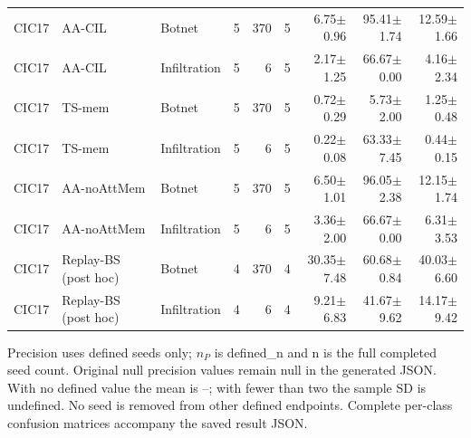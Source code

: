 \begin{table}[t]
\begin{tabular}{lllrrrrrr}
CIC17 & AA-CIL & Botnet & 5 & 370 & 5 & 6.75$\pm$0.96 & 95.41$\pm$1.74 & 12.59$\pm$1.66 \\
CIC17 & AA-CIL & Infiltration & 5 & 6 & 5 & 2.17$\pm$1.25 & 66.67$\pm$0.00 & 4.16$\pm$2.34 \\
CIC17 & TS-mem & Botnet & 5 & 370 & 5 & 0.72$\pm$0.29 & 5.73$\pm$2.00 & 1.25$\pm$0.48 \\
CIC17 & TS-mem & Infiltration & 5 & 6 & 5 & 0.22$\pm$0.08 & 63.33$\pm$7.45 & 0.44$\pm$0.15 \\
CIC17 & AA-noAttMem & Botnet & 5 & 370 & 5 & 6.50$\pm$1.01 & 96.05$\pm$2.38 & 12.15$\pm$1.74 \\
CIC17 & AA-noAttMem & Infiltration & 5 & 6 & 5 & 3.36$\pm$2.00 & 66.67$\pm$0.00 & 6.31$\pm$3.53 \\
CIC17 & Replay-BS (post hoc) & Botnet & 4 & 370 & 4 & 30.35$\pm$7.48 & 60.68$\pm$0.84 & 40.03$\pm$6.60 \\
CIC17 & Replay-BS (post hoc) & Infiltration & 4 & 6 & 4 & 9.21$\pm$6.83 & 41.67$\pm$9.62 & 14.17$\pm$9.42 \\
\bottomrule
\end{tabular}
\par\vspace{2pt}\begin{minipage}{.98\linewidth}\footnotesize Precision uses defined seeds only; $n_P$ is defined\_n and n is the full completed seed count. Original null precision values remain null in the generated JSON. With no defined value the mean is --; with fewer than two the sample SD is undefined. No seed is removed from other defined endpoints. Complete per-class confusion matrices accompany the saved result JSON.\end{minipage}
\end{table}
